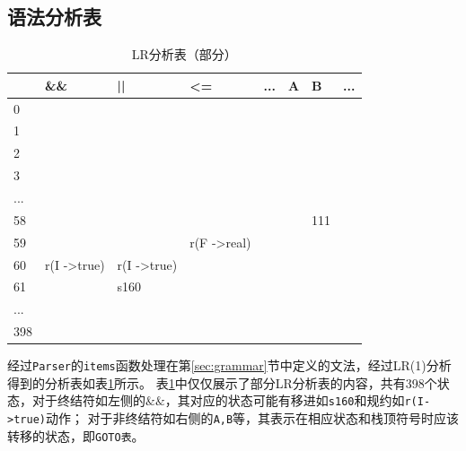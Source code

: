\documentclass{ML}
\begin{document}
\subsection{语法分析表}
\begin{table}[H]
    \centering
    \begin{tabular}{|l|l|l|l|l|l|l|l|}
    \hline
        & \&\&                    & ||                      & \textless{}=            & ... & A & B   & ... \\ \hline
    0   &                         &                         &                         &     &   &     &     \\ \hline
    1   &                         &                         &                         &     &   &     &     \\ \hline
    2   &                         &                         &                         &     &   &     &     \\ \hline
    3   &                         &                         &                         &     &   &     &     \\ \hline
    ... &                         &                         &                         &     &   &     &     \\ \hline
    58  &                         &                         &                         &     &   & 111 &     \\ \hline
    59  &                         &                         & r(F -\textgreater real) &     &   &     &     \\ \hline
    60  & r(I -\textgreater true) & r(I -\textgreater true) &                         &     &   &     &     \\ \hline
    61  &                         & s160                    &                         &     &   &     &     \\ \hline
    ... &                         &                         &                         &     &   &     &     \\ \hline
    398 &                         &                         &                         &     &   &     &     \\ \hline
    \end{tabular}
    \caption{LR分析表（部分）}\label{tab:lr}
\end{table}
经过\texttt{Parser}的\texttt{items}函数处理在第\ref{sec:grammar}节中定义的文法，经过LR(1)分析得到的分析表如表\ref{tab:lr}所示。
表\ref{tab:lr}中仅仅展示了部分LR分析表的内容，共有398个状态，对于终结符如左侧的$\&\&$，其对应的状态可能有移进如\texttt{s160}和规约如\texttt{r(I->true)}动作；
对于非终结符如右侧的\texttt{A,B}等，其表示在相应状态和栈顶符号时应该转移的状态，即\texttt{GOTO表}。
\end{document}
